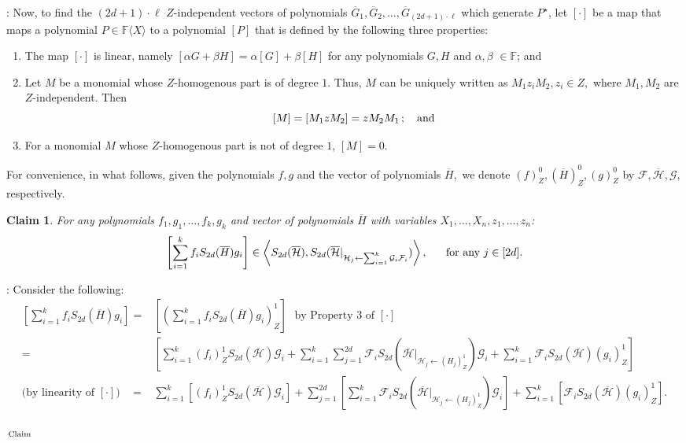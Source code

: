 \documentclass[12pt,reqno]{article}
\newtheorem*{claim*}{Claim}
\renewcommand{\dot}[1]{{#1}^\star}
\newcommand\F{\ensuremath{\mathbb F}}
\newcommand{\cd}{\cdot}
\renewcommand{\l}{\ell}
\newcommand{\freea}{\ensuremath{\F\langle X\rangle}}
\newenvironment{proof}{\QuadSpace\par\noindent{\bf Proof}:}{\EndProof\HalfSpace}
\newenvironment{proofclaim}{\QuadSpace\par\noindent{\bf Proof of claim}:}
{\vrule width 1ex height 1ex depth 0pt $_{\textrm{\,Claim}}$ \HalfSpace}
\newcommand{\QuadSpace}{\vspace{0.25\baselineskip}}
\newcommand{\HalfSpace}{\vspace{0.5\baselineskip}}
\newcommand{\EndProof}{ \hfill \vrule width 1ex height 1ex depth 0pt }
\newcommand{\nx}[1]{#1_1,\ldots,#1_{n}}
\renewcommand{\t}[1]{\overline{#1}}
\newcommand{\anbra}[1]{\ensuremath{\left[ #1\right]}}
\newcommand{\zd}[2]{(#1)_Z^{#2}}
\newcommand{\Number}{(2d+1)\cd\l}
\newcommand{\ideal}[1]{\ensuremath{\left\langle #1\right\rangle}}
\begin{document}
\begin{proof}
Now, to find the $\Number$ $Z$-independent vectors of polynomials $\overline G_{1},\overline G_2,\ldots,\overline G_{\Number}$ which generate $\dot{P}$, let $\anbra{\cdot}$ be a map that maps a polynomial $P\in \freea$ to a polynomial $\anbra{P}$ that is defined by the following three properties:

\begin{enumerate}
\item The map $\anbra{\cdot}$ is linear, namely $\anbra{\alpha G+\beta H}=\alpha\anbra{G}+\beta\anbra{H}$ for any polynomials $G,H$ and $\alpha,\beta$ $\in\F$;
and\item Let  $M$ be a monomial whose  $Z$-homogenous part is of degree $1$.  Thus,  $M$  can be uniquely written as $M_1 z_{i}M_2,z_{i}\in Z,$ where $M_1,M_2$ are $Z$-independent.
Then $$\anbra{M}=\anbra{M_1 zM_2}=zM_2 M_1\,;~~~\hbox{and}$$
\item For a monomial $M$ whose  $Z$-homogenous part is not of degree $1$,  $\anbra{M}=0$.
\end{enumerate}

For convenience,  in what follows, given the polynomials $f,g$ and the vector of polynomials $\t H,$ we denote $\zd{f}{0},\zd{\t H}{0},\zd{g}{0}$ by $\mathcal{F}, \overline{\mathcal{ H}},\mathcal{G}$, respectively.

\begin{claim*}
For any  polynomials $f_1,g_1 ,\ldots,  f_k,g_k$ and vector of polynomials $\t H$ with variables $\nx{X},\nx{ z}$:
$$\anbra{ \sum_{i=1}^k f_i S_{2d}(\t H) g_i}\in\ideal{S_{2d}(\t{\mathcal{H}}),S_{2d}(\overline {\mathcal{H}}|_{ {\mathcal{H}}_j\leftarrow \sum_{i=1}^k\mathcal{G}_i\mathcal{F}_i})},~~~~\hbox{
for any }j\in[2d].$$
\end{claim*}
\begin{proofclaim}
Consider the following:
\begin{align*}
\anbra{\sum_{i=1}^k f_i S_{2d}(\t H) g_i}=&\anbra{\zd{\sum_{i=1}^k f_i S_{2d}(\t H) g_i}{1}}\text{~~by Property 3 of $[\cd]$}\\
=&\anbra{ \sum_{i=1}^k \zd{f_i}{1}  S_{2d}(\overline{\mathcal{ H}})\mathcal{G}_i+\sum_{i=1}^k \sum_{j=1}^{2d} \mathcal{F}_iS_{2d}\left(\overline {\mathcal{H}}|_{\mathcal{H}_j\leftarrow \zd{ H_j}{1}}\right)\mathcal{G}_i+\sum_{i=1}^k \mathcal{F}_i S_{2d}(\t {\mathcal{H}})\zd{g_i}{1}}        \\
\text{(by linearity of $[\cd]$)}~~~~ =&\sum_{i=1}^k\anbra{ \zd{f_i}{1}S_{2d}(\t {\mathcal{ H}})\mathcal{G}_i}+\sum_{j=1}^{2d} \anbra{\sum_{i=1}^k \mathcal{F}_i S_{2d}\left(\t {\mathcal{H}}|_{ {\mathcal{H}}_j\leftarrow \zd{ H_j}{1}}\right)\mathcal{ G}_i}+\sum_{i=1}^k\anbra{ \mathcal{F}_i S_{2d}(\t {\mathcal{ H}})\zd{g_i}{1}}.
\end{align*}


\end{proofclaim}
\end{proof}
\end{document}
